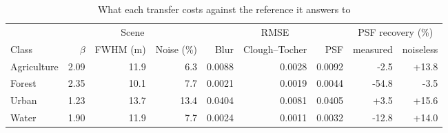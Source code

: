 \begin{table}[t]
\centering
\caption{What each transfer costs against the reference it answers to}
\label{tab:resampling_error}
\footnotesize
\begin{tabular}{@{}lrrr rrr rr@{}}
\toprule
 & \multicolumn{3}{c}{Scene} & \multicolumn{3}{c}{RMSE} & \multicolumn{2}{c}{PSF recovery (\%)} \\
\cmidrule(lr){2-4}\cmidrule(lr){5-7}\cmidrule(lr){8-9}
Class & $\beta$ & FWHM (m) & Noise (\%) & Blur & Clough--Tocher & PSF & measured & noiseless \\
\midrule
Agriculture & 2.09 & 11.9 & 6.3 & 0.0088 & 0.0028 & 0.0092 & -2.5 & +13.8 \\
Forest & 2.35 & 10.1 & 7.7 & 0.0021 & 0.0019 & 0.0044 & -54.8 & -3.5 \\
Urban & 1.23 & 13.7 & 13.4 & 0.0404 & 0.0081 & 0.0405 & +3.5 & +15.6 \\
Water & 1.90 & 11.9 & 7.7 & 0.0024 & 0.0011 & 0.0032 & -12.8 & +14.0 \\
\bottomrule
\end{tabular}

\end{table}
